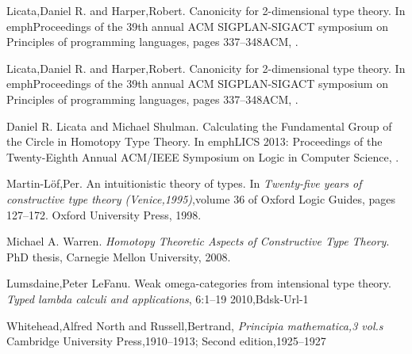 \documentclass[12pt]{article}
\begin{document}
\begin{thebibliography}{99}
 {Licata,Daniel R. and Harper,Robert}. {Canonicity for 2-dimensional type theory}. In emph{Proceedings of the 39th annual ACM SIGPLAN-SIGACT symposium on Principles of programming languages}, pages {337--348}{ACM}, .

 {Licata,Daniel R. and Harper,Robert}. {Canonicity for 2-dimensional type theory}. In emph{Proceedings of the 39th annual ACM SIGPLAN-SIGACT symposium on Principles of programming languages}, pages {337--348}{ACM}, .

 {Daniel R. Licata and Michael Shulman}. {Calculating the Fundamental Group of the Circle in Homotopy Type Theory}. In emph{LICS 2013: Proceedings of the Twenty-Eighth Annual ACM/IEEE Symposium on Logic in Computer Science}, .

 {Martin-L{\"o}f,Per}. {An intuitionistic theory of types}. In \emph{Twenty-five years of constructive type theory ({V}enice,1995)},volume 36 of {Oxford Logic Guides}, pages {127--172}. {Oxford University Press}, 1998.

 {Michael A. Warren}. \emph{Homotopy Theoretic Aspects of Constructive Type Theory}. PhD thesis, {Carnegie Mellon University}, {2008}.

 {Lumsdaine,Peter Le{F}anu}. {Weak omega-categories from intensional type theory}. \emph{Typed lambda calculi and applications}, {6}:{1--19} {2010},Bdsk-Url-1

 {Whitehead,Alfred North and Russell,Bertrand}, \emph{{Principia mathematica,3 vol.s}}  {Cambridge University Press},{1910--1913; Second edition,1925--1927}

\end{thebibliography}
\end{document}
